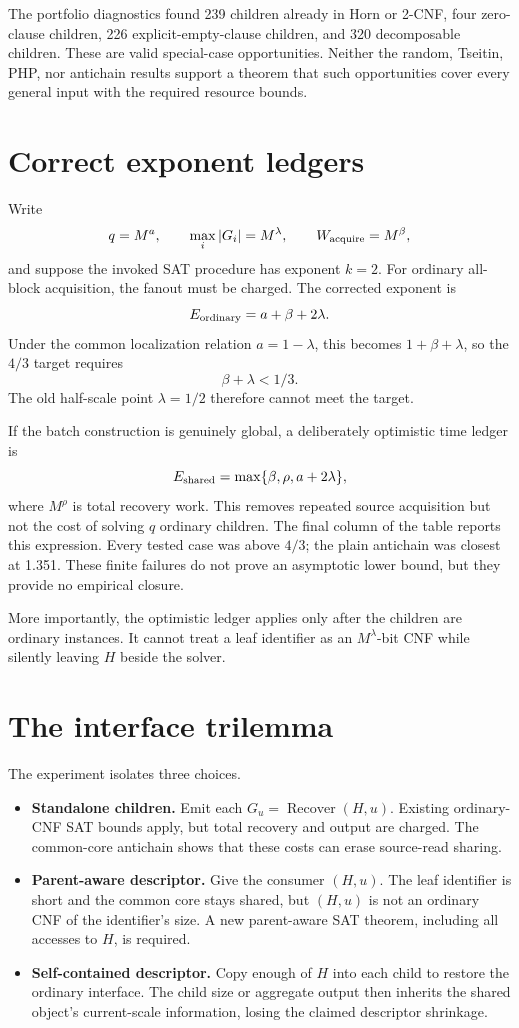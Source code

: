 \documentclass[11pt]{article}
\begin{document}
The portfolio diagnostics found 239 children already in Horn or 2-CNF, four
zero-clause children, 226 explicit-empty-clause children, and 320 decomposable
children.  These are valid special-case opportunities.  Neither the random,
Tseitin, PHP, nor antichain results support a theorem that such opportunities
cover every general input with the required resource bounds.

\section{Correct exponent ledgers}

Write
\[
 q=M^a,\qquad \max_i|G_i|=M^\lambda,\qquad
 W_{\rm acquire}=M^\beta,
\]
and suppose the invoked SAT procedure has exponent $k=2$.  For ordinary
all-block acquisition, the fanout must be charged.  The corrected exponent is
\[
             E_{\rm ordinary}=a+\beta+2\lambda.
\]
Under the common localization relation $a=1-\lambda$, this becomes
$1+\beta+\lambda$, so the $4/3$ target requires
\[
                   \boxed{\beta+\lambda<1/3}.
\]
The old half-scale point $\lambda=1/2$ therefore cannot meet the target.

If the batch construction is genuinely global, a deliberately optimistic
time ledger is
\[
 E_{\rm shared}=\max\{\beta,\rho,a+2\lambda\},
\]
where $M^\rho$ is total recovery work.  This removes repeated source
acquisition but not the cost of solving $q$ ordinary children.  The final
column of the table reports this expression.  Every tested case was above
$4/3$; the plain antichain was closest at 1.351.  These finite failures do not
prove an asymptotic lower bound, but they provide no empirical closure.

More importantly, the optimistic ledger applies only after the children are
ordinary instances.  It cannot treat a leaf identifier as an $M^\lambda$-bit
CNF while silently leaving $H$ beside the solver.

\section{The interface trilemma}

The experiment isolates three choices.
\begin{itemize}
\item[] \textbf{Standalone children.}  Emit each
$G_u=\operatorname{Recover}(H,u)$.  Existing ordinary-CNF SAT bounds apply,
but total recovery and output are charged.  The common-core antichain shows
that these costs can erase source-read sharing.
\item[] \textbf{Parent-aware descriptor.}  Give the consumer $(H,u)$.  The
leaf identifier is short and the common core stays shared, but $(H,u)$ is not
an ordinary CNF of the identifier's size.  A new parent-aware SAT theorem,
including all accesses to $H$, is required.
\item[] \textbf{Self-contained descriptor.}  Copy enough of $H$ into each
child to restore the ordinary interface.  The child size or aggregate output
then inherits the shared object's current-scale information, losing the
claimed descriptor shrinkage.
\end{itemize}
\end{document}
